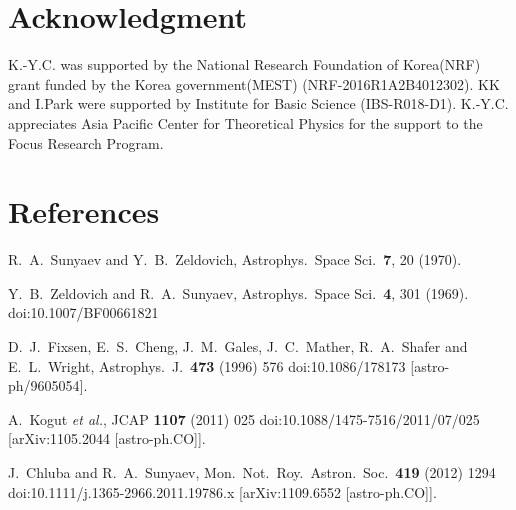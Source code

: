 \documentclass[5p,times]{elsarticle}
\begin{document}
{\section*{Acknowledgment}
K.-Y.C. was supported by the National Research Foundation of Korea(NRF) grant funded by the Korea government(MEST) (NRF-2016R1A2B4012302). KK and I.Park were supported by Institute for Basic Science (IBS-R018-D1). K.-Y.C. appreciates Asia Pacific Center for Theoretical Physics for the support to the Focus Research Program.


\section*{References}
%
\begin{thebibliography}{99}


  R.~A.~Sunyaev and Y.~B.~Zeldovich,
  Astrophys.\ Space Sci.\  {\bf 7}, 20 (1970).

  Y.~B.~Zeldovich and R.~A.~Sunyaev,
  Astrophys.\ Space Sci.\  {\bf 4}, 301 (1969).
  doi:10.1007/BF00661821


  D.~J.~Fixsen, E.~S.~Cheng, J.~M.~Gales, J.~C.~Mather, R.~A.~Shafer and E.~L.~Wright,
  Astrophys.\ J.\  {\bf 473} (1996) 576
  doi:10.1086/178173
  [astro-ph/9605054].


  A.~Kogut {\it et al.},
  JCAP {\bf 1107} (2011) 025
  doi:10.1088/1475-7516/2011/07/025
  [arXiv:1105.2044 [astro-ph.CO]].

  J.~Chluba and R.~A.~Sunyaev,
  Mon.\ Not.\ Roy.\ Astron.\ Soc.\  {\bf 419} (2012) 1294
  doi:10.1111/j.1365-2966.2011.19786.x
  [arXiv:1109.6552 [astro-ph.CO]].


\end{thebibliography}}
\end{document}
